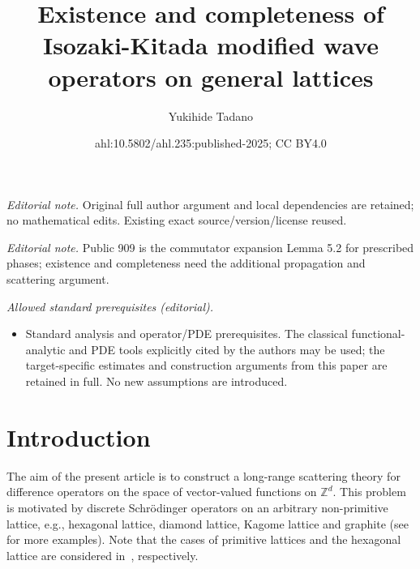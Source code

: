 \documentclass[10pt,a4paper]{amsart}
\title{Existence and completeness of Isozaki-Kitada modified wave operators on general lattices}
\author{Yukihide Tadano}
\date{ahl:10.5802/ahl.235:published-2025; CC BY4.0}
\newcommand{\Z}{\mathbb{Z}}
\begin{document}
\maketitle
\noindent\textit{Editorial note.} Original full author argument and local dependencies are retained; no mathematical edits. Existing exact source/version/license reused.\par\medskip
\noindent\textit{Editorial note.} Public 909 is the commutator expansion Lemma 5.2 for prescribed phases; existence and completeness need the additional propagation and scattering argument.\par\medskip
\noindent\textit{Allowed standard prerequisites (editorial).}\begin{itemize}
\item Standard analysis and operator/PDE prerequisites. The classical functional-analytic and PDE tools explicitly cited by the authors may be used; the target-specific estimates and construction arguments from this paper are retained in full. No new assumptions are introduced.
\end{itemize}\medskip
\section{Introduction}

The aim of the present article is to construct a long-range scattering theory for difference operators on the space of vector-valued functions on $\Z^d$. This problem is motivated by discrete Schr\"odinger operators on an arbitrary non-primitive lattice, e.g., hexagonal lattice, diamond lattice, Kagome lattice and graphite (see~\cite{An-I-M} for more examples). Note that the cases of primitive lattices and the hexagonal lattice are considered in~\cite{T1,T2}, respectively.
\end{document}
